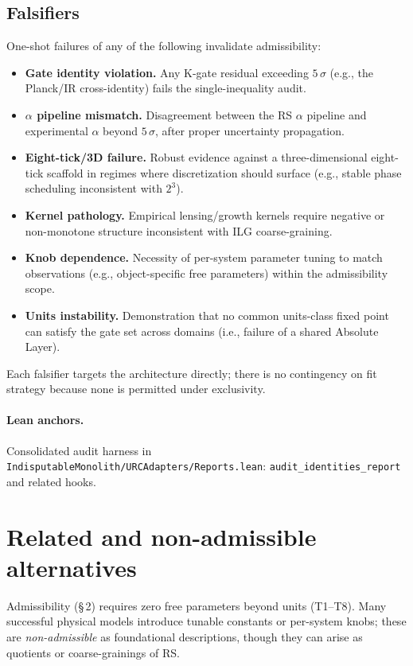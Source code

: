 \documentclass[11pt]{article}
\begin{document}
\subsection{Falsifiers}
One\mbox{-}shot failures of any of the following invalidate admissibility:
\begin{itemize}
  \item \textbf{Gate identity violation.} Any K\mbox{-}gate residual exceeding \(5\,\sigma\) (e.g., the Planck/IR cross\mbox{-}identity) fails the single\mbox{-}inequality audit.
  \item \textbf{\(\alpha\) pipeline mismatch.} Disagreement between the RS \(\alpha\) pipeline and experimental \(\alpha\) beyond \(5\,\sigma\), after proper uncertainty propagation.
  \item \textbf{Eight\mbox{-}tick/3D failure.} Robust evidence against a three\mbox{-}dimensional eight\mbox{-}tick scaffold in regimes where discretization should surface (e.g., stable phase scheduling inconsistent with \(2^3\)).
  \item \textbf{Kernel pathology.} Empirical lensing/growth kernels require negative or non\mbox{-}monotone structure inconsistent with ILG coarse\mbox{-}graining.
  \item \textbf{Knob dependence.} Necessity of per\mbox{-}system parameter tuning to match observations (e.g., object\mbox{-}specific free parameters) within the admissibility scope.
  \item \textbf{Units instability.} Demonstration that no common units\mbox{-}class fixed point can satisfy the gate set across domains (i.e., failure of a shared Absolute Layer).
\end{itemize}
Each falsifier targets the architecture directly; there is no contingency on fit strategy because none is permitted under exclusivity.

\paragraph{Lean anchors.} Consolidated audit harness in \texttt{IndisputableMonolith/URCAdapters/Reports.lean}: \texttt{audit\_identities\_report} and related hooks.

\section{Related and non\mbox{-}admissible alternatives}
Admissibility (\S\,2) requires zero free parameters beyond units (T1--T8). Many successful physical models introduce tunable constants or per\mbox{-}system knobs; these are \emph{non\mbox{-}admissible} as foundational descriptions, though they can arise as quotients or coarse\mbox{-}grainings of RS.
\end{document}
